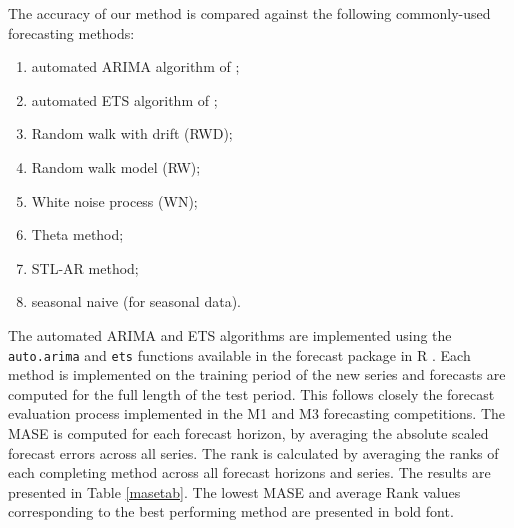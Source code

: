 \documentclass[11pt,a4paper,]{article}
\providecommand{\tightlist}{%
  \setlength{\itemsep}{0pt}\setlength{\parskip}{0pt}}
\theoremstyle{definition}
\theoremstyle{definition}
\theoremstyle{definition}
\theoremstyle{remark}
\begin{document}
The accuracy of our method is compared against the following
commonly-used forecasting methods:

\begin{enumerate}
\def\labelenumi{\arabic{enumi}.}
\tightlist
\item
  automated ARIMA algorithm of \textcite{Hyndman2008};
\item
  automated ETS algorithm of \textcite{Hyndman2008};
\item
  Random walk with drift (RWD);
\item
  Random walk model (RW);
\item
  White noise process (WN);
\item
  Theta method;
\item
  STL-AR method;
\item
  seasonal naive (for seasonal data).
\end{enumerate}

The automated ARIMA and ETS algorithms are implemented using the
\texttt{auto.arima} and \texttt{ets} functions available in the forecast
package in R \autocite{forecast}. Each method is implemented on the
training period of the new series and forecasts are computed for the
full length of the test period. This follows closely the forecast
evaluation process implemented in the M1 and M3 forecasting
competitions. The MASE is computed for each forecast horizon, by
averaging the absolute scaled forecast errors across all series. The
rank is calculated by averaging the ranks of each completing method
across all forecast horizons and series. The results are presented in
Table \ref{masetab}. The lowest MASE and average Rank values
corresponding to the best performing method are presented in bold font.
\end{document}
